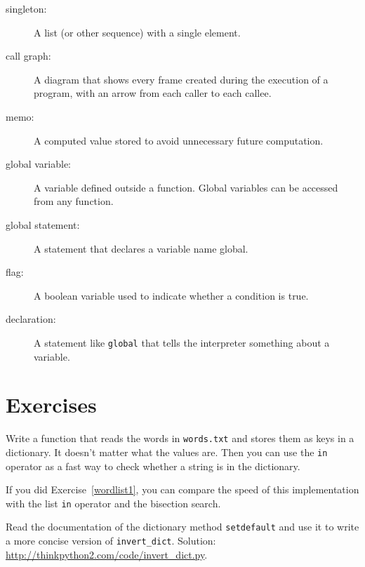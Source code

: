 \documentclass[10pt]{book}
\begin{document}
\begin{description}
\item[singleton:] A list (or other sequence) with a single element.

\item[call graph:] A diagram that shows every frame created during
the execution of a program, with an arrow from each caller to
each callee.

\item[memo:] A computed value stored to avoid unnecessary future
computation.

\item[global variable:]  A variable defined outside a function.  Global
variables can be accessed from any function.

\item[global statement:]  A statement that declares a variable name
global.

\item[flag:] A boolean variable used to indicate whether a condition
is true.

\item[declaration:] A statement like {\tt global} that tells the
interpreter something about a variable.

\end{description}


\section{Exercises}

\begin{exercise}
\label{wordlist2}

Write a function that reads the words in {\tt words.txt} and
stores them as keys in a dictionary.  It doesn't matter what the
values are.  Then you can use the {\tt in} operator
as a fast way to check whether a string is in
the dictionary.

If you did Exercise~\ref{wordlist1}, you can compare the speed
of this implementation with the list {\tt in} operator and the
bisection search.

\end{exercise}


\begin{exercise}
\label{setdefault}

Read the documentation of the dictionary method {\tt setdefault}
and use it to write a more concise version of \verb"invert_dict".
Solution: \url{http://thinkpython2.com/code/invert_dict.py}.

\end{exercise}
\end{document}
